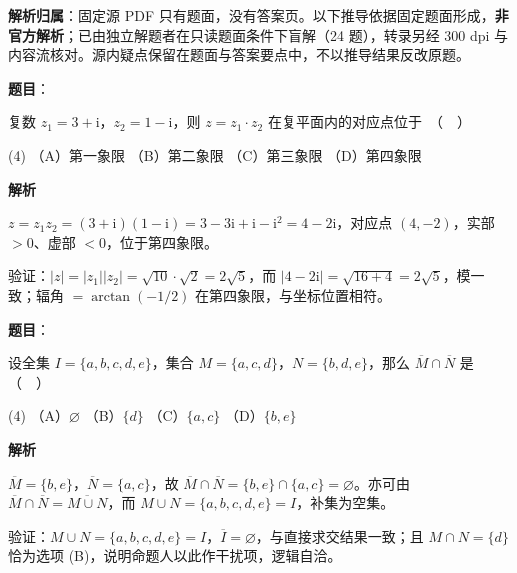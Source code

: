 

\begin{gknotice}
\textbf{解析归属}：固定源 PDF 只有题面，没有答案页。以下推导依据固定题面形成，\textbf{非官方解析}；已由独立解题者在只读题面条件下盲解（24 题），转录另经 300 dpi 与内容流核对。源内疑点保留在题面与答案要点中，不以推导结果反改原题。
\end{gknotice}

\begin{answer}

\textbf{题目}：

复数 $z_1 = 3 + \mathrm{i}$，$z_2 = 1 - \mathrm{i}$，则 $z = z_1 \cdot z_2$ 在复平面内的对应点位于　（　）

\begin{gkopts}(4)
\task （A）第一象限
\task （B）第二象限
\task （C）第三象限
\task （D）第四象限
\end{gkopts}

\textbf{解析}

$z=z_1z_2=(3+\mathrm i)(1-\mathrm i)=3-3\mathrm i+\mathrm i-\mathrm i^2=4-2\mathrm i$，对应点 $(4,-2)$，实部 $>0$、虚部 $<0$，位于第四象限。

验证：$|z|=|z_1||z_2|=\sqrt{10}\cdot\sqrt2=2\sqrt5$，而 $|4-2\mathrm i|=\sqrt{16+4}=2\sqrt5$，模一致；辐角 $=\arctan(-1/2)$ 在第四象限，与坐标位置相符。


\end{answer}
\begin{answer}

\textbf{题目}：

设全集 $I = \{a, b, c, d, e\}$，集合 $M = \{a, c, d\}$，$N = \{b, d, e\}$，那么 $\overline{M} \cap \overline{N}$ 是　（　）

\begin{gkopts}(4)
\task （A）$\varnothing$
\task （B）$\{d\}$
\task （C）$\{a, c\}$
\task （D）$\{b, e\}$
\end{gkopts}

\textbf{解析}

$\overline M=\{b,e\}$，$\overline N=\{a,c\}$，故 $\overline M\cap\overline N=\{b,e\}\cap\{a,c\}=\varnothing$。亦可由 $\overline M\cap\overline N=\overline{M\cup N}$，而 $M\cup N=\{a,b,c,d,e\}=I$，补集为空集。

验证：$M\cup N=\{a,b,c,d,e\}=I$，$\overline I=\varnothing$，与直接求交结果一致；且 $M\cap N=\{d\}$ 恰为选项 (B)，说明命题人以此作干扰项，逻辑自洽。


\end{answer}
